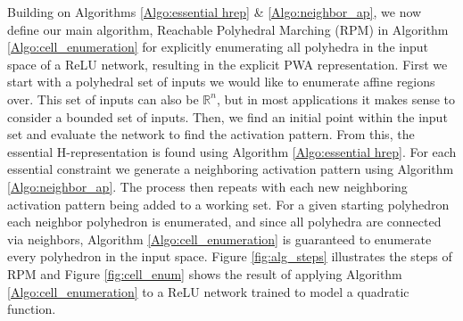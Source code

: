 


Building on Algorithms \ref{Algo:essential hrep} \& \ref{Algo:neighbor_ap}, we now define our main algorithm, Reachable Polyhedral Marching (RPM) in Algorithm \ref{Algo:cell_enumeration} for explicitly enumerating all polyhedra in the input space of a ReLU network, resulting in the explicit PWA representation. 
First we start with a polyhedral set of inputs we would like to enumerate affine regions over.
This set of inputs can also be $\mathbb{R}^n$, but in most applications it makes sense to consider a bounded set of inputs.
Then, we find an initial point within the input set and evaluate the network to find the activation pattern. 
From this, the essential H-representation is found using Algorithm \ref{Algo:essential hrep}. 
For each essential constraint we generate a neighboring activation pattern using Algorithm \ref{Algo:neighbor_ap}. 
The process then repeats with each new neighboring activation pattern being added to a working set. 
For a given starting polyhedron each neighbor polyhedron is enumerated, and since all polyhedra are connected via neighbors, Algorithm \ref{Algo:cell_enumeration} is guaranteed to enumerate every polyhedron in the input space. 
Figure \ref{fig:alg_steps} illustrates the steps of RPM and Figure \ref{fig:cell_enum} shows the result of applying Algorithm \ref{Algo:cell_enumeration} to a ReLU network trained to model a quadratic function.

